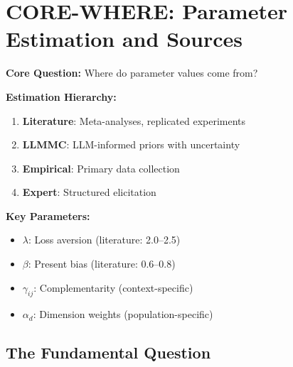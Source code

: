 \chapter{CORE-WHERE: Parameter Estimation and Sources}
\label{app:core-where}

\begin{abstract}
This appendix answers the fifth fundamental question:
\textit{``Where do parameter values come from?''}
We establish a four-tier estimation hierarchy:
(1) Literature-validated meta-analytic values,
(2) LLMMC (LLM Monte Carlo) informed priors,
(3) Empirical calibration from primary data,
(4) Expert elicitation with structured protocols.
Quality criteria ensure transparency about uncertainty and provenance.
\end{abstract}

\begin{tcolorbox}[colback=blue!5!white, colframe=blue!75!black,
    title=Quick Reference: CORE-WHERE]

\textbf{Core Question:} Where do parameter values come from?

\textbf{Estimation Hierarchy:}
\begin{enumerate}[nosep]
\item \textbf{Literature}: Meta-analyses, replicated experiments
\item \textbf{LLMMC}: LLM-informed priors with uncertainty
\item \textbf{Empirical}: Primary data collection
\item \textbf{Expert}: Structured elicitation
\end{enumerate}

\textbf{Key Parameters:}
\begin{itemize}[nosep]
\item $\lambda$: Loss aversion (literature: 2.0--2.5)
\item $\beta$: Present bias (literature: 0.6--0.8)
\item $\gamma_{ij}$: Complementarity (context-specific)
\item $\alpha_d$: Dimension weights (population-specific)
\end{itemize}

\end{tcolorbox}

\section{The Fundamental Question}
\label{sec:where-fundamental}

